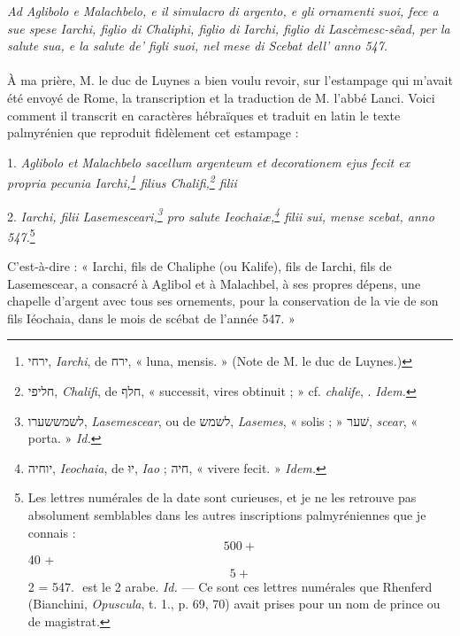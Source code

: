 \documentclass{article}
\newcommand*\arabicAAG{}
\newcommand*\svgAAA{}
\newcommand*\svgAAB{}
\newcommand*\svgAAC{}
\newcommand*\svgAAD{}
\newcommand*\svgAAE{}
\begin{document}

\begin{center}
\emph{Ad Aglibolo e Malachbelo, e il simulacro di argento, e gli ornamenti suoi, fece a sue spese Iarchi, figlio di Chaliphi, figlio di Iarchi, figlio di Lascèmesc-sêad, per la salute sua, e la salute de' figli suoi, nel mese di Scebat dell' anno 547.}
\end{center}

\paragraph{}
À ma prière, M. le duc de Luynes a bien voulu revoir, sur l'estampage qui m'avait été envoyé de Rome, la transcription et la traduction de M. l'abbé Lanci. Voici comment il transcrit en caractères hébraïques et traduit en latin le texte palmyrénien que reproduit fidèlement cet estampage :

\begin{center}
1. \emph{Aglibolo et Malachbelo sacellum argenteum et decorationem ejus fecit ex propria pecunia Iarchi,\footnote{\texthebrew{ירחי}, \emph{Iarchi}, de \texthebrew{ירח}, « luna, mensis. » (Note de M. le duc de Luynes.)} filius Chalifi,\footnote{\texthebrew{חליפי}, \emph{Chalifi}, de \texthebrew{חלף}, « successit, vires obtinuit ; » cf. \emph{chalife}, $\arabicAAG$. \emph{Idem.}} filii}

2. \emph{Iarchi, filii Lasemesceari,\footnote{\texthebrew{לשמששערו}, \emph{Lasemescear}, ou de \texthebrew{לשמש}, \emph{Lasemes}, « solis ; » \texthebrew{שׁער}, \emph{scear}, « porta. » \emph{Id.}} pro salute Ieochaiæ,\footnote{\texthebrew{יוחיה}, \emph{Ieochaia}, de \texthebrew{יוּ}, \emph{Iao} ; \texthebrew{חיה}, « vivere fecit. » \emph{Idem.}} filii sui, mense scebat, anno 547.}\footnote{Les lettres numérales de la date sont curieuses, et je ne les retrouve pas absolument semblables dans les autres inscriptions palmyréniennes que je connais : $\svgAAB$ 500 + $\svgAAC$ 40 + $\svgAAD$ 5 + $\svgAAE$ 2 = 547. $\svgAAE$ est le 2 arabe. \emph{Id.} --- Ce sont ces lettres numérales que Rhenferd (Bianchini, \emph{Opuscula}, t. 1., p. 69, 70) avait prises pour un nom de prince ou de magistrat.}
\end{center}
\hspace*{0mm}C'est-à-dire : « Iarchi, fils de Chaliphe (ou Kalife), fils de Iarchi, fils de Lasemescear, a consacré à Aglibol et à Malachbel, à ses propres dépens, une chapelle d'argent avec tous ses ornements, pour la conservation de la vie de son fils Iéochaia, dans le mois de scébat de l'année 547. »
\end{document}
